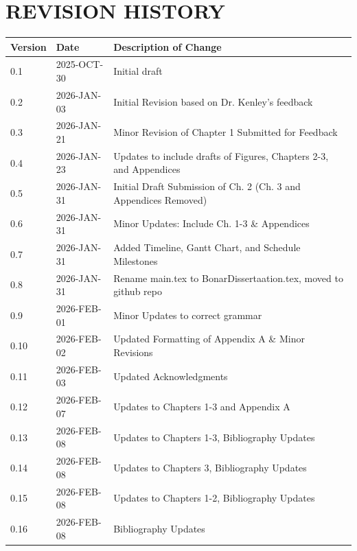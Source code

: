 \chapter*{\Large \uppercase{Revision History}}
\label{chap:RevisionHistory}

\begin{table}[H]
  \centering
  \begin{tabular}{@{}lll@{}}
    \toprule
    \textbf{Version} & \textbf{Date} & \textbf{Description of Change}  \\
    \midrule
    0.1 & 2025-OCT-30 & Initial draft \\
    \midrule
    0.2 & 2026-JAN-03 & Initial Revision based on Dr. Kenley's feedback \\
    \midrule
    0.3 & 2026-JAN-21 & Minor Revision of Chapter 1 Submitted for Feedback \\
    \midrule
    0.4 & 2026-JAN-23 & Updates to include drafts of Figures, Chapters 2-3, and Appendices \\
    \midrule
    0.5 & 2026-JAN-31 & Initial Draft Submission of Ch. 2 (Ch. 3 and Appendices Removed) \\
    \midrule
    0.6 & 2026-JAN-31 & Minor Updates: Include Ch. 1-3 \& Appendices \\
    \midrule
    0.7 & 2026-JAN-31 & Added Timeline, Gantt Chart, and Schedule Milestones \\
    \midrule
    0.8 & 2026-JAN-31 &  Rename main.tex to BonarDissertaation.tex, moved to github repo\\
    \midrule
    0.9 & 2026-FEB-01 & Minor Updates to correct grammar\\
    \midrule
    0.10 & 2026-FEB-02 & Updated Formatting of Appendix A \& Minor Revisions\\
    \midrule
    0.11 & 2026-FEB-03 & Updated Acknowledgments\\
    \midrule
    0.12 & 2026-FEB-07 & Updates to Chapters 1-3 and Appendix A\\
    \midrule
    0.13 & 2026-FEB-08 & Updates to Chapters 1-3, Bibliography Updates\\
    \midrule
    0.14 & 2026-FEB-08 & Updates to Chapters 3, Bibliography Updates\\
    \midrule
    0.15 & 2026-FEB-08 & Updates to Chapters 1-2, Bibliography Updates\\
    \midrule
    0.16 & 2026-FEB-08 & Bibliography Updates\\

\end{tabular}
\end{table}
